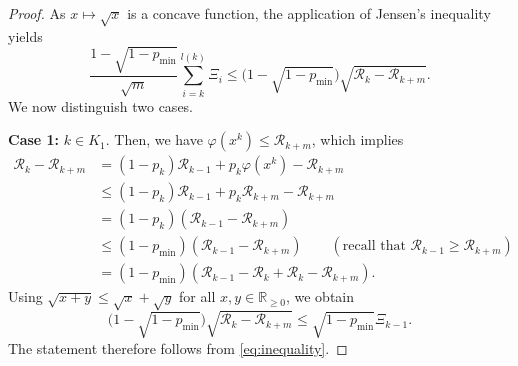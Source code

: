 \documentclass[a4paper, 12pt]{article}
\numberwithin{equation}{section}
\theoremstyle{bolddef}
\theoremstyle{definition}
\theoremstyle{boldplain}
\newcommand{\xk}{x^k}
\newcommand{\pmin}{p_{\min}}
\newcommand{\Rvalue}{\mathcal{R}}
\begin{document}
\begin{proof}
As $x \mapsto \sqrt{x}$ is a concave function, the application of Jensen's inequality yields
\begin{equation}\label{eq:inequality}
   \frac{1-\sqrt{1-p_{\min}}}{\sqrt{m}} \sum_{i = k}^{l(k)} \Xi_i \leq \big( 1-\sqrt{1-\pmin} \big) \sqrt{\Rvalue_k - \Rvalue_{k+m}}.
\end{equation}
We now distinguish two cases.\smallskip

\noindent
\textbf{Case 1:} $k \in K_1$. 
Then, we have $ \varphi (\xk) \leq \Rvalue_{k+m} $, which implies
\begin{align*}
   \Rvalue_k - \Rvalue_{k+m} &= (1-p_k) \Rvalue_{k-1} + p_k \varphi(\xk) - \Rvalue_{k+m}\\
   & \leq (1-p_k) \Rvalue_{k-1} + p_k \Rvalue_{k+m} - \Rvalue_{k+m}\\
   & = (1-p_k) (\Rvalue_{k-1} - \Rvalue_{k+m})\\
	&\leq (1-\pmin) (\Rvalue_{k-1} - \Rvalue_{k+m})
	\qquad (\text{recall that } \Rvalue_{k-1} \geq \Rvalue_{k+m})\\
	&= (1-\pmin) (\Rvalue_{k-1} - \Rvalue_k + \Rvalue_k - \Rvalue_{k+m}).
\end{align*}
Using $\sqrt{x+y} \leq \sqrt{x} + \sqrt{y}$ for all $x, y \in \mathbb{R}_{\geq 0}$, we obtain
\begin{equation*}
   \big( 1- \sqrt{1- \pmin} \big) \sqrt{\Rvalue_k - \Rvalue_{k+m}} \leq \sqrt{1-\pmin} \Xi_{k-1}.
\end{equation*}
The statement therefore follows from \eqref{eq:inequality}. \smallskip


\end{proof}
\end{document}

